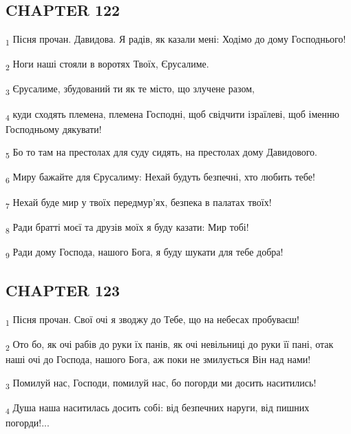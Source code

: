 \subsection{CHAPTER 122}
\begin{tcolorbox}
\textsubscript{1} Пісня прочан. Давидова. Я радів, як казали мені: Ходімо до дому Господнього!
\end{tcolorbox}
\begin{tcolorbox}
\textsubscript{2} Ноги наші стояли в воротях Твоїх, Єрусалиме.
\end{tcolorbox}
\begin{tcolorbox}
\textsubscript{3} Єрусалиме, збудований ти як те місто, що злучене разом,
\end{tcolorbox}
\begin{tcolorbox}
\textsubscript{4} куди сходять племена, племена Господні, щоб свідчити ізраїлеві, щоб іменню Господньому дякувати!
\end{tcolorbox}
\begin{tcolorbox}
\textsubscript{5} Бо то там на престолах для суду сидять, на престолах дому Давидового.
\end{tcolorbox}
\begin{tcolorbox}
\textsubscript{6} Миру бажайте для Єрусалиму: Нехай будуть безпечні, хто любить тебе!
\end{tcolorbox}
\begin{tcolorbox}
\textsubscript{7} Нехай буде мир у твоїх передмур'ях, безпека в палатах твоїх!
\end{tcolorbox}
\begin{tcolorbox}
\textsubscript{8} Ради братті моєї та друзів моїх я буду казати: Мир тобі!
\end{tcolorbox}
\begin{tcolorbox}
\textsubscript{9} Ради дому Господа, нашого Бога, я буду шукати для тебе добра!
\end{tcolorbox}
\subsection{CHAPTER 123}
\begin{tcolorbox}
\textsubscript{1} Пісня прочан. Свої очі я зводжу до Тебе, що на небесах пробуваєш!
\end{tcolorbox}
\begin{tcolorbox}
\textsubscript{2} Ото бо, як очі рабів до руки їх панів, як очі невільниці до руки її пані, отак наші очі до Господа, нашого Бога, аж поки не змилується Він над нами!
\end{tcolorbox}
\begin{tcolorbox}
\textsubscript{3} Помилуй нас, Господи, помилуй нас, бо погорди ми досить наситились!
\end{tcolorbox}
\begin{tcolorbox}
\textsubscript{4} Душа наша наситилась досить собі: від безпечних наруги, від пишних погорди!...
\end{tcolorbox}

